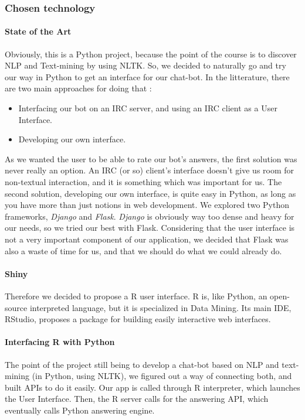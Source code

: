 \subsubsection{Chosen technology}
\label{subs:Technology}

\paragraph{State of the Art}
\label{par:SotA}
Obviously, this is a Python project, because the point of the course is to discover NLP and Text-mining by using NLTK.
So, we decided to naturally go and try our way in Python to get an interface for our chat-bot.
In the litterature, there are two main approaches for doing that :
\begin{itemize}
    \item Interfacing our bot on an IRC server, and using an IRC client as a User Interface.
    \item Developing our own interface.
\end{itemize}
As we wanted the user to be able to rate our bot's answers, the first solution was never really an option.
An IRC (or so) client's interface doesn't give us room for non-textual interaction, and it is something which was important for us.
The second solution, developing our own interface, is quite easy in Python, as long as you have more than just notions in web development.
We explored two Python frameworks, \textit{Django} and \textit{Flask}.
\textit{Django} is obviously way too dense and heavy for our needs, so we tried our best with Flask.
Considering that the user interface is not a very important component of our application, we decided that Flask was also a waste of time for us, and that we should do what we could already do.

\paragraph{Shiny}
\label{par:Shiny}
Therefore we decided to propose a R user interface.
R is, like Python, an open-source interpreted language, but it is specialized in Data Mining.
Its main IDE, RStudio, proposes a package for building easily interactive web interfaces.

\paragraph{Interfacing R with Python}
\label{par:rPython}
The point of the project still being to develop a chat-bot based on NLP and text-mining (in Python, using NLTK), we figured out a way of connecting both, and built APIs to do it easily.
Our app is called through R interpreter, which launches the User Interface. Then, the R server calls for the answering API, which eventually calls Python answering engine.

